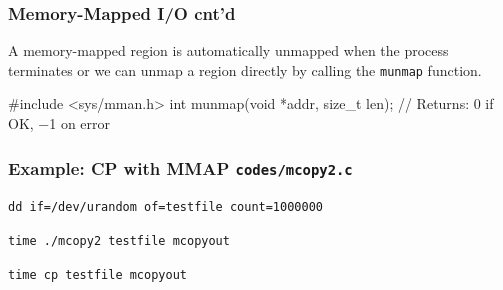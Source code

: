 \documentclass[newPxFont,sthlmFooter,nooffset]{beamer}
\begin{document}
\begin{frame}[t, fragile]
  \frametitle{Memory-Mapped I/O cnt'd}
A memory-mapped region is automatically unmapped when the process terminates or we can unmap a region directly by calling the \texttt{munmap} function.
\begin{codedef}
#include <sys/mman.h>
int munmap(void *addr, size_t len);
// Returns: 0 if OK, −1 on error
\end{codedef}


\end{frame}


\begin{frame}
  \frametitle{Example: CP with MMAP \texttt{codes/mcopy2.c}}
        

\texttt{dd if=/dev/urandom of=testfile count=1000000}

\texttt{time ./mcopy2 testfile mcopyout}

\texttt{time cp testfile mcopyout}
\end{frame}

\end{document}
